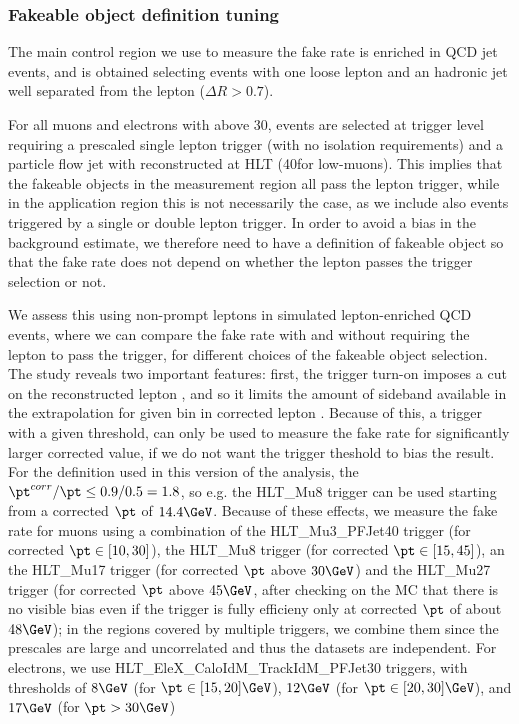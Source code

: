 \subsubsection{Fakeable object definition tuning}

The main control region we use to measure the fake rate is enriched in QCD jet events, and is obtained selecting events with one loose lepton and an hadronic jet well separated from the lepton ($\Delta R> 0.7$).

For all muons and electrons with \pt above 30\GeV, events are selected at trigger level requiring a prescaled single lepton trigger (with no isolation requirements) and a particle flow jet with \GeV reconstructed at HLT (40\GeV for low-\pt muons).
This implies that the fakeable objects in the measurement region all pass the lepton trigger, while in the application region this is not necessarily
the case, as we include also events triggered by a single or double lepton trigger.
In order to avoid a bias in the background estimate, we therefore need to have a definition of fakeable object so that the fake rate does not depend on
whether the lepton passes the trigger selection or not.

We assess this using non-prompt leptons in simulated lepton-enriched QCD events, where we can compare the fake rate with and without 
requiring the lepton to pass the trigger, for different choices of the fakeable object selection.
The study reveals two important features: first, the trigger turn-on imposes a cut on the reconstructed lepton \pt, and so it limits the amount of 
sideband available in the extrapolation for given bin in corrected lepton \pt. Because of this, a trigger with a given threshold, can only 
be used to measure the fake rate for significantly larger corrected \pt value, if we do not want the trigger theshold to bias the result.
For the definition used in this version of the analysis, the $\pt^{corr}/\pt \le 0.9/0.5=1.8$, so e.g. the HLT\_Mu8 trigger can be used starting from a corrected $\pt$ of $14.4\GeV$.
Because of these effects, we measure the fake rate for muons using a combination of the HLT\_Mu3\_PFJet40 trigger (for corrected $\pt \in [10,30]$\GeV), the HLT\_Mu8 trigger (for corrected $\pt \in [15, 45]$\GeV), an the HLT\_Mu17 trigger (for corrected $\pt$ above $30 \GeV$) and the HLT\_Mu27 trigger (for corrected $\pt$ above $45 \GeV$, after checking on the MC that there is no visible bias even if the trigger is fully efficieny only at corrected $\pt$ of about $48\GeV$); in the regions covered by multiple triggers, we combine them since the prescales are large and uncorrelated and thus the datasets are independent. For electrons, we use HLT\_EleX\_CaloIdM\_TrackIdM\_PFJet30 triggers, with thresholds of $8 \GeV$ (for $\pt \in [15,20]\GeV$), $12 \GeV$ (for $\pt \in [20,30]\GeV$), and $17 \GeV$ (for $\pt > 30\GeV$)

